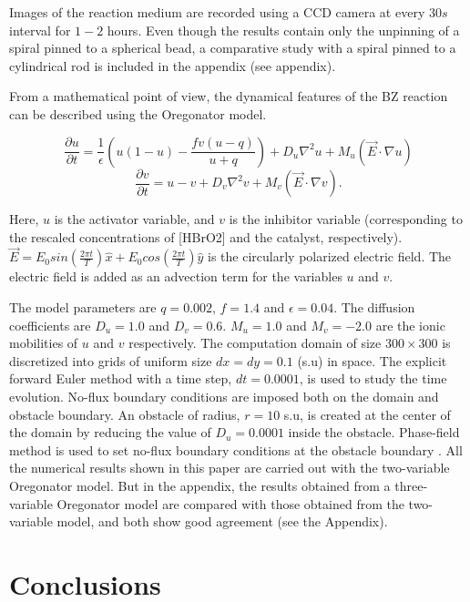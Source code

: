 \documentclass[%
 reprint,
 amsmath,amssymb,
 aps,
prb,
]{revtex4-2}
\begin{document}
Images of the reaction medium are recorded using a CCD camera at every $30 s$ interval for $1-2$ hours. Even though the results contain only the unpinning of a spiral pinned to a spherical bead, a comparative study with a spiral pinned to a cylindrical rod is included in the appendix (see appendix).


From a mathematical point of view, the dynamical features of the BZ reaction can be described using the Oregonator model. 

\begin{equation}\label{E_uoregonator}
\frac{\partial u}{\partial t}=\frac{1}{\epsilon}(u(1-u)-\frac{fv(u-q)}{u+q})
+D_{u}\nabla^2u+M_{u}(\vec{E} \cdot \nabla u)
\end{equation}
\begin{equation}\label{E_voregonator}
\frac{\partial v}{\partial t}=u-v+D_{v}\nabla^2v+M_{v}(\vec{E} \cdot \nabla v).
\end{equation}

Here, $u$ is the activator variable, and $v$ is the inhibitor variable (corresponding to the rescaled concentrations of [HBrO2] and the catalyst, respectively). $\vec{E} = E_{0} sin(\frac{2\pi t}{T})\hat{x} + E_{0} cos(\frac{2\pi t}{T})\hat{y}$ is the circularly polarized electric field. The electric field is added as an advection term for the variables $u$ and $v$. 

The model parameters are $q = 0.002$, $f = 1.4$ and $\epsilon=0.04$. The diffusion coefficients are $D_{u}=1.0$ and $D_{v}=0.6$. $M_{u}=1.0$ and $M_{v}=-2.0$ are the ionic mobilities of $u$ and $v$ respectively. The computation domain of size $300 \times 300$ is discretized into grids of uniform size $dx=dy=0.1$ (s.u) in space. The explicit forward Euler method with a time step, $dt=0.0001$, is used to study the time evolution. No-flux boundary conditions are imposed both on the domain and obstacle boundary. An obstacle of radius, $r = 10$ s.u, is created at the center of the domain by reducing the value of $D_{u}=0.0001$ inside the obstacle. Phase-field method is used to set no-flux boundary conditions at the obstacle boundary \cite{fenton2005modeling}. 
All the numerical results shown in this paper are carried out with the two-variable Oregonator model. But in the appendix, the results obtained from a three-variable Oregonator model are compared with those obtained from the two-variable model, and both show good agreement (see the Appendix).



\section{Conclusions}
\end{document}
